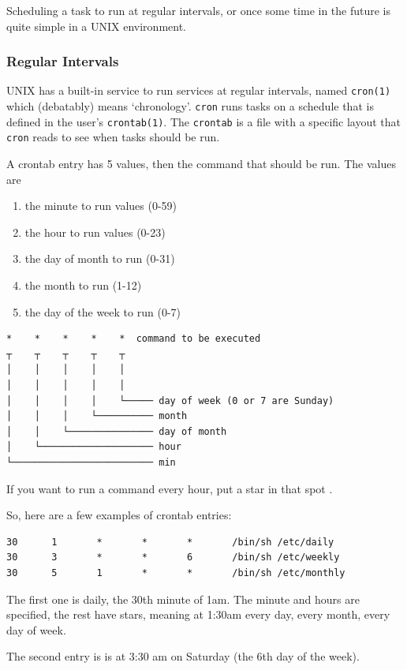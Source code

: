 Scheduling a task to run at regular intervals, or once some time in the future 
is quite simple in a UNIX environment.

\subsubsection{Regular Intervals}
UNIX has a built-in service to run services at regular intervals, named {\tt cron(1)}
which (debatably) means `chronology'. {\tt cron} runs tasks on a schedule that is
defined in the user's {\tt crontab(1)}. The {\tt crontab} is a file with 
a specific layout that {\tt cron} reads to see when tasks should be run.

A crontab entry has 5 values, then the command that should be run. 
The  values are 
\begin{enumerate}
    \item the minute to run values (0-59)
    \item the hour to run values (0-23)
    \item the day of month to run (0-31)
    \item the month to run (1-12)
    \item the day of the week to run (0-7)
\end{enumerate}

\begin{verbatim}
*    *    *    *    *  command to be executed
┬    ┬    ┬    ┬    ┬
│    │    │    │    │
│    │    │    │    │
│    │    │    │    └───── day of week (0 or 7 are Sunday)
│    │    │    └────────── month
│    │    └─────────────── day of month
│    └──────────────────── hour
└───────────────────────── min
\end{verbatim}

If you want to run a command every hour, put a star in that spot {\tt *}.

So, here are a few examples of crontab entries:

\begin{verbatim}
30      1       *       *       *       /bin/sh /etc/daily
30      3       *       *       6       /bin/sh /etc/weekly
30      5       1       *       *       /bin/sh /etc/monthly
\end{verbatim}

The first one is daily, the 30th minute of 1am. The
minute and hours are specified, the rest have stars, meaning at 1:30am 
every day, every month, every day of week.

The second entry is is at 3:30 am on Saturday (the 6th day of the week).

